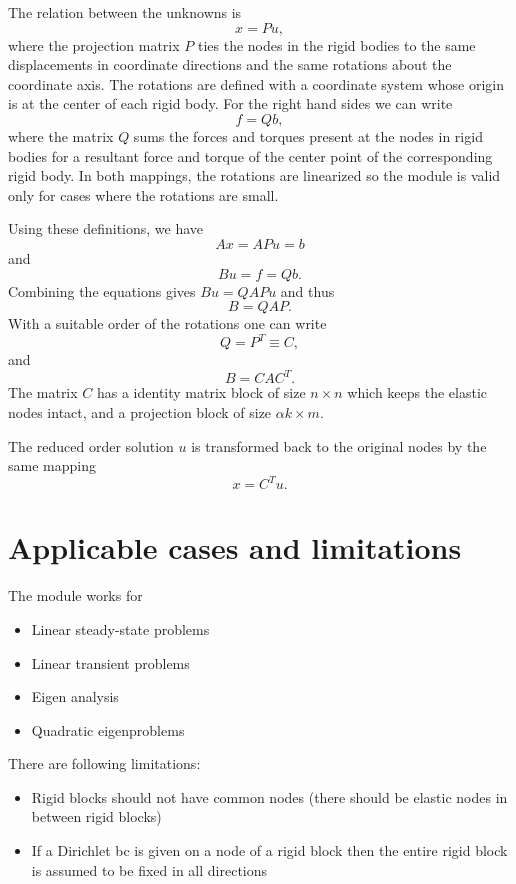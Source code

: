 \begin{versiona}
The relation between the unknowns is 
\begin{equation}
x = Pu,
\end{equation}
where the projection matrix $P$ ties the nodes in the rigid bodies to
the same displacements in coordinate directions and the same rotations
about the coordinate axis. The rotations are defined with a coordinate
system whose origin is at the center of each rigid body.  For the right
hand sides we can write
\begin{equation}
f = Qb,
\end{equation}
where the matrix $Q$ sums the forces and torques present at the nodes
in rigid bodies for a resultant force and torque of the center point
of the corresponding rigid body. In both mappings, the rotations are
linearized so the module is valid only for cases where the rotations
are small.

Using these definitions, we have
\begin{equation}
Ax=APu=b
\end{equation}
and
\begin{equation}
Bu=f=Qb.
\end{equation}
Combining the equations gives $Bu=QAPu$ and thus
\begin{equation}
B = QAP.
\end{equation}
With a suitable order of the rotations one can write 
\begin{equation}
Q=P^T \equiv C,
\end{equation}
and
\begin{equation}
B = CAC^T.
\end{equation}
The matrix $C$ has a identity matrix block of size $n\times n$ which
keeps the elastic nodes intact, and a projection block of size
$\alpha k\times m$. 

The reduced order solution $u$ is transformed back to the original
nodes by the same mapping
\begin{equation}
x=C^T u.
\end{equation}


\section{Applicable cases and limitations}

The module works for
\begin{itemize}
\item Linear steady-state problems
\item Linear transient problems
\item Eigen analysis
\item Quadratic eigenproblems
\end{itemize}
%
There are following limitations:
\begin{itemize}
\item Rigid blocks should not have common nodes (there should be
elastic nodes in between rigid blocks)
\item If a Dirichlet bc is given on a node of a rigid block then the
entire rigid block is assumed to be fixed in all directions
\end{itemize}




\end{versiona}
